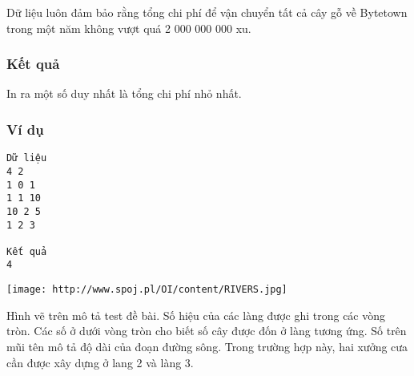    Dữ liệu luôn đảm bảo rằng tổng chi phí để vận chuyển tất cả cây gỗ về Bytetown trong một năm không vượt quá 2 000 000 000 xu.  

\subsubsection{   Kết quả  }

   In ra một số duy nhất là tổng chi phí nhỏ nhất.  

\subsubsection{   Ví dụ  }
\begin{verbatim}
Dữ liệu
4 2
1 0 1
1 1 10
10 2 5
1 2 3

Kết quả
4
\end{verbatim}
\texttt{[image: http://www.spoj.pl/OI/content/RIVERS.jpg]}

   Hình vẽ trên mô tả test đề bài. Số hiệu của các làng được ghi trong các vòng tròn. Các số ở dưới vòng tròn cho biết số cây được đốn ở làng tương ứng. Số trên mũi tên mô tả độ dài của đoạn đường sông. Trong trường hợp này, hai xưởng cưa cần được xây dựng ở lang 2 và làng 3.  